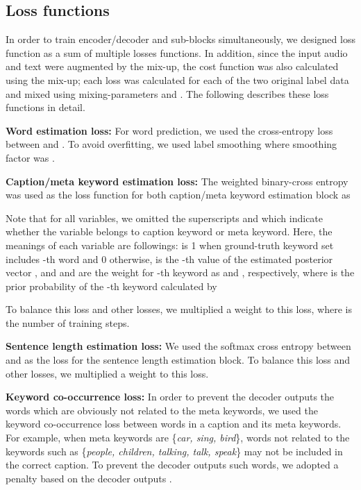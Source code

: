 \documentclass{article}
\begin{document}
\begin{sloppy}
\subsection{Loss functions}

In order to train encoder/decoder and sub-blocks simultaneously, we designed loss function as a sum of multiple losses functions.
In addition, since the input audio and text were augmented by the mix-up, the cost function was also calculated using the mix-up; each loss was calculated for each of the two original label data and mixed using mixing-parameters  and .
The following describes these loss functions in detail.


\vspace{3pt}
\noindent
{\bf Word estimation loss:} For word prediction, we used the cross-entropy loss between  and . To avoid overfitting, we used label smoothing where smoothing factor was .

\vspace{3pt}
\noindent
{\bf Caption/meta keyword estimation loss:}
The weighted binary-cross entropy was used as the loss function for both caption/meta keyword estimation block as

Note that for all variables, we omitted the superscripts  and  which indicate whether the variable belongs to caption keyword or meta keyword.
Here, the meanings of each variable are followings: 
 is 1 when ground-truth keyword set includes -th word and 0 otherwise, 
 is the -th value of the estimated posterior vector , and
 and  are the weight for -th keyword as  and , respectively, where  is the prior probability of the -th keyword calculated by

To balance this loss and other losses, we multiplied a weight  to this loss, where  is the number of training steps.


\vspace{3pt}
\noindent
{\bf Sentence length estimation loss:}
We used the softmax cross entropy between  and  as the loss for the sentence length estimation block.
To balance this loss and other losses, we multiplied a weight  to this loss.



\vspace{3pt}
\noindent
{\bf Keyword co-occurrence loss:}
In order to prevent the decoder outputs the words which are obviously not related to the meta keywords, we used the keyword co-occurrence loss between words in a caption and its meta keywords.
For example, when meta keywords are \{{\it car, sing, bird}\}, words not related to the keywords such as \{{\it people, children, talking, talk, speak}\} may not be included in the correct caption.
To prevent the decoder outputs such words, we adopted a penalty based on the decoder outputs .


\end{sloppy}
\end{document}
